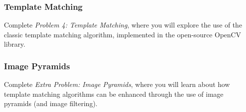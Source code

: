 \subsubsection{Template Matching}
Complete \textit{Problem 4: Template Matching}, where you will explore the use of the classic template matching algorithm, implemented in the open-source OpenCV library.

\subsubsection{Image Pyramids}
Complete \textit{Extra Problem: Image Pyramids}, where you will learn about how template matching algorithms can be enhanced through the use of image pyramids (and image filtering).